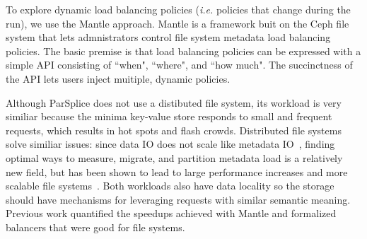 To explore dynamic load balancing policies ({\it i.e.} policies that change
during the run), we use the Mantle approach.  Mantle is a framework buit on the
Ceph file system that lets admnistrators control file system metadata load
balancing policies. The basic premise is that load balancing policies can be
expressed with a simple API consisting of ``when", ``where", and ``how much".
The succinctness of the API lets users inject muitiple, dynamic policies.

Although ParSplice does not use a distibuted file system, its workload is very
similiar because the minima key-value store responds to small and frequent
requests, which results in hot spots and flash crowds.  Distributed file
systems solve similiar issues: since data IO does not scale like metadata
IO~\cite{roselli:atec2000-FS-workloads}, finding optimal ways to measure,
migrate, and partition metadata load is a relatively new field, but has been
shown to lead to large performance increases and more scalable file
systems~\cite{zheng:pdsw2014-batchfs, zheng:pdsw2015-deltafs, grider:pdsw2015-marfs,
ren:sc2014-indexfs, patil:fast2011-giga+, brandt:msst2003-lh}.  Both workloads
also have data locality so the storage should have mechanisms for leveraging
requests with similar semantic meaning.  Previous work quantified the speedups
achieved with Mantle and formalized balancers that were good for file systems.


